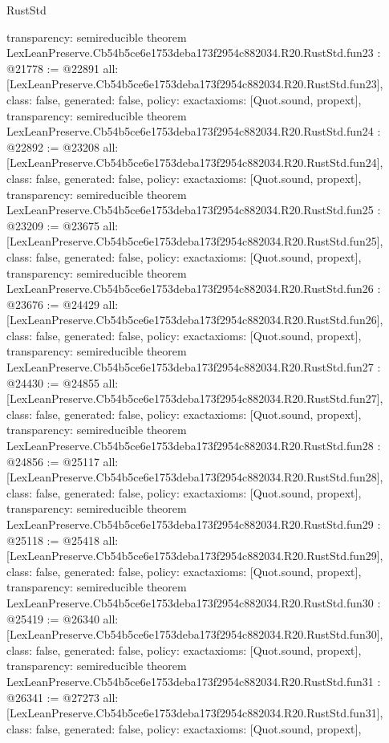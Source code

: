 \begin{lexlean}{RustStd}
\begin{coremodule}
{  transparency: semireducible
}
theorem LexLeanPreserve.Cb54b5ce6e1753deba173f2954c882034.R20.RustStd.fun23 : @21778 := @22891 {
  all: [LexLeanPreserve.Cb54b5ce6e1753deba173f2954c882034.R20.RustStd.fun23],
  class: false,
  generated: false,
  policy: exact{axioms: [Quot.sound, propext]},
  transparency: semireducible
}
theorem LexLeanPreserve.Cb54b5ce6e1753deba173f2954c882034.R20.RustStd.fun24 : @22892 := @23208 {
  all: [LexLeanPreserve.Cb54b5ce6e1753deba173f2954c882034.R20.RustStd.fun24],
  class: false,
  generated: false,
  policy: exact{axioms: [Quot.sound, propext]},
  transparency: semireducible
}
theorem LexLeanPreserve.Cb54b5ce6e1753deba173f2954c882034.R20.RustStd.fun25 : @23209 := @23675 {
  all: [LexLeanPreserve.Cb54b5ce6e1753deba173f2954c882034.R20.RustStd.fun25],
  class: false,
  generated: false,
  policy: exact{axioms: [Quot.sound, propext]},
  transparency: semireducible
}
theorem LexLeanPreserve.Cb54b5ce6e1753deba173f2954c882034.R20.RustStd.fun26 : @23676 := @24429 {
  all: [LexLeanPreserve.Cb54b5ce6e1753deba173f2954c882034.R20.RustStd.fun26],
  class: false,
  generated: false,
  policy: exact{axioms: [Quot.sound, propext]},
  transparency: semireducible
}
theorem LexLeanPreserve.Cb54b5ce6e1753deba173f2954c882034.R20.RustStd.fun27 : @24430 := @24855 {
  all: [LexLeanPreserve.Cb54b5ce6e1753deba173f2954c882034.R20.RustStd.fun27],
  class: false,
  generated: false,
  policy: exact{axioms: [Quot.sound, propext]},
  transparency: semireducible
}
theorem LexLeanPreserve.Cb54b5ce6e1753deba173f2954c882034.R20.RustStd.fun28 : @24856 := @25117 {
  all: [LexLeanPreserve.Cb54b5ce6e1753deba173f2954c882034.R20.RustStd.fun28],
  class: false,
  generated: false,
  policy: exact{axioms: [Quot.sound, propext]},
  transparency: semireducible
}
theorem LexLeanPreserve.Cb54b5ce6e1753deba173f2954c882034.R20.RustStd.fun29 : @25118 := @25418 {
  all: [LexLeanPreserve.Cb54b5ce6e1753deba173f2954c882034.R20.RustStd.fun29],
  class: false,
  generated: false,
  policy: exact{axioms: [Quot.sound, propext]},
  transparency: semireducible
}
theorem LexLeanPreserve.Cb54b5ce6e1753deba173f2954c882034.R20.RustStd.fun30 : @25419 := @26340 {
  all: [LexLeanPreserve.Cb54b5ce6e1753deba173f2954c882034.R20.RustStd.fun30],
  class: false,
  generated: false,
  policy: exact{axioms: [Quot.sound, propext]},
  transparency: semireducible
}
theorem LexLeanPreserve.Cb54b5ce6e1753deba173f2954c882034.R20.RustStd.fun31 : @26341 := @27273 {
  all: [LexLeanPreserve.Cb54b5ce6e1753deba173f2954c882034.R20.RustStd.fun31],
  class: false,
  generated: false,
  policy: exact{axioms: [Quot.sound, propext]},
}
\end{coremodule}
\end{lexlean}
